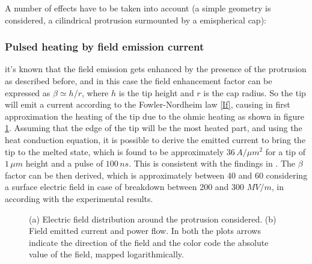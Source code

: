 A number of effects have to be taken into account (a simple geometry is considered, a cilindrical protrusion surmounted by a emispherical cap): 

\subsubsection{Pulsed heating by field emission current}

it's known that the field emission gets enhanced by the presence of the protrusion as described before, and in this case the field enhancement factor can be expressed as $\beta \simeq h/r$, where $h$ is the tip height and $r$ is the cap radius. So the tip will emit a current according to the Fowler-Nordheim law \ref{If}, causing in first approximation the heating of the tip due to the ohmic heating as shown in figure \ref{figure_S_c}. Assuming that the edge of the tip will be the most heated part, and using the heat conduction equation, it is possible to derive the emitted current to bring the tip to the melted state, which is found to be approximately $36\, A/\mu m^2$ for a tip of $1 \, \mu m$ height and a pulse of $100\, ns$. This is consistent with the findings in \cite{soviet:1983}. The $\beta$ factor can be then derived, which is approximately between 40 and 60 considering a surface electric field in case of breakdown between 200 and 300 $MV/m$, in according with the experimental results.

 \begin{figure}
 \centering
 \hspace{5mm}
 \caption{(a) Electric field distribution around the protrusion considered. (b) Field emitted current and power flow. In both the plots arrows indicate the direction of the field and the color code the absolute value of the field, mapped logarithmically.\cite{Grudiev:newLoc} }
 \label{figure_S_c}
 
 \end{figure}



